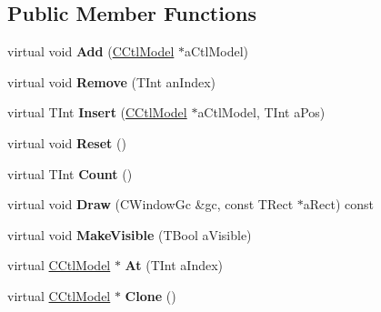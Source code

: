 \subsection*{Public Member Functions}
\begin{DoxyCompactItemize}
\item 
\mbox{\label{classCCtlColumn_a53e43b705782cc6e87b254541b54428a}} 
virtual void {\bfseries Add} (\hyperlink{classCCtlModel}{C\+Ctl\+Model} $\ast$a\+Ctl\+Model)
\item 
\mbox{\label{classCCtlColumn_acd150f2401b0c593e653fe23523d644c}} 
virtual void {\bfseries Remove} (T\+Int an\+Index)
\item 
\mbox{\label{classCCtlColumn_a9eeb51471aa301aca4659b44f1e06b86}} 
virtual T\+Int {\bfseries Insert} (\hyperlink{classCCtlModel}{C\+Ctl\+Model} $\ast$a\+Ctl\+Model, T\+Int a\+Pos)
\item 
\mbox{\label{classCCtlColumn_a14e0f5d0a85cee79330493369e2e119b}} 
virtual void {\bfseries Reset} ()
\item 
\mbox{\label{classCCtlColumn_a494608a7b5783174f846b6f4f6fd02e6}} 
virtual T\+Int {\bfseries Count} ()
\item 
\mbox{\label{classCCtlColumn_a17465d6905c7edd344501482328266ed}} 
virtual void {\bfseries Draw} (C\+Window\+Gc \&gc, const T\+Rect $\ast$a\+Rect) const
\item 
\mbox{\label{classCCtlColumn_a777f49862d0987da6cc24b39764456a1}} 
virtual void {\bfseries Make\+Visible} (T\+Bool a\+Visible)
\item 
\mbox{\label{classCCtlColumn_a2a6a9b186bc0688b15e32ed72bd6b8c2}} 
virtual \hyperlink{classCCtlModel}{C\+Ctl\+Model} $\ast$ {\bfseries At} (T\+Int a\+Index)
\item 
\mbox{\label{classCCtlColumn_a9d8c4c9a055229c2c5c7c00fa7c50cf2}} 
virtual \hyperlink{classCCtlModel}{C\+Ctl\+Model} $\ast$ {\bfseries Clone} ()
\item 
\mbox{\label{classCCtlColumn_ac1f1643f1a63b3459dce276c8b0bdc61}} 

\end{DoxyCompactItemize}
